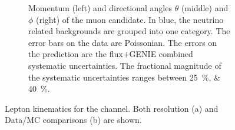 \begin{figure}[htb]
\begin{center}
\begin{subfigure}{\textwidth}
    \caption{\label{fig:final_numu:datamc} Momentum (left) and directional angles $\theta$ (middle) and $\phi$ (right) of the \numucc muon candidate. In blue, the neutrino related backgrounds are grouped into one category. The error bars on the data are Poissonian. The errors on the prediction are the flux+GENIE combined systematic uncertainties. The fractional magnitude of the systematic uncertainties ranges between \SIlist{25;40}{\%}.}
    \end{subfigure}
\caption[Lepton kinematics for the \numucc channel. Both resolution and data/MC comparisons are shown]{\label{fig:final_numu} Lepton kinematics for the \numucc channel. Both resolution (a) and Data/MC comparisons (b) are shown.}
\end{center}
\end{figure}

\clearpage